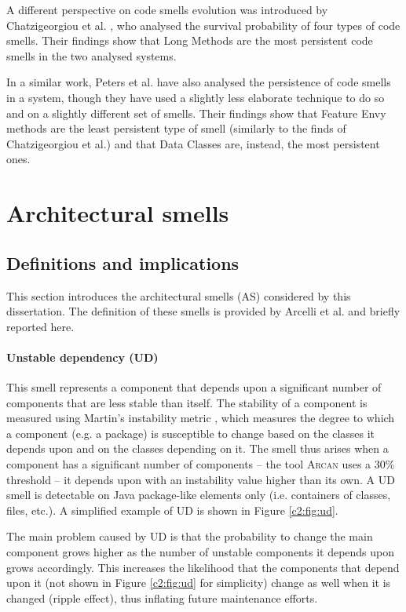 A different perspective on code smells evolution was introduced by Chatzigeorgiou et al. \cite{Chatzigeorgiou2014}, who analysed the survival probability of four types of code smells. Their findings show that Long Methods are the most persistent code smells in the two analysed systems.

In a similar work, Peters et al. \cite{Peters2012} have also analysed the persistence of code smells in a system, though they have used a slightly less elaborate technique to do so and on a slightly different set of smells.
Their findings show that Feature Envy methods are the least persistent type of smell (similarly to the finds of Chatzigeorgiou et al.) and that Data Classes are, instead, the most persistent ones.

\section{Architectural smells}\label{c2:sec:arch-smells}
\subsection{Definitions and implications}
This section introduces the architectural smells (AS) considered by this dissertation. The definition of these smells is provided by Arcelli et al. \cite{Arcelli2016} and briefly reported here.

\paragraph{Unstable dependency (UD)}\label{c2:sec:arch-smells-ud}
This smell represents a component that depends upon a significant number of components that are less stable than itself.
The stability of a component is measured using Martin's instability metric \cite{Martin2018}, which measures the degree to which a component (e.g. a package) is susceptible to change based on the classes it depends upon and on the classes depending on it.
The smell thus arises when a component has a significant number of components -- the tool \textsc{Arcan} uses a 30\% threshold \cite{Arcelli2017} -- it depends upon with an instability value higher than its own.
A UD smell is detectable on Java package-like elements only (i.e. containers of classes, files, etc.). A simplified example of UD is shown in Figure \ref{c2:fig:ud}. 

The main problem caused by UD is that the probability to change the main component grows higher as the number of unstable components it depends upon grows accordingly. This increases the likelihood that the components that depend upon it (not shown in Figure \ref{c2:fig:ud} for simplicity) change as well when it is changed (ripple effect), thus inflating future maintenance efforts.

